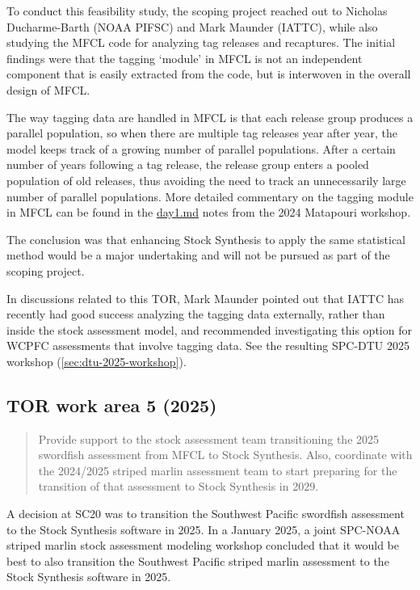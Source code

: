 \documentclass{SCreport}
\newcommand\blob
{https://github.com/PacificCommunity/ofp-sam-transition-plan/blob/main}
\begin{document}
To conduct this feasibility study, the scoping project reached out to Nicholas
Ducharme-Barth (NOAA PIFSC) and Mark Maunder (IATTC), while also studying the
MFCL code for analyzing tag releases and recaptures. The initial findings were
that the tagging `module' in MFCL is not an independent component that is easily
extracted from the code, but is interwoven in the overall design of MFCL.

The way tagging data are handled in MFCL is that each release group produces a
parallel population, so when there are multiple tag releases year after year,
the model keeps track of a growing number of parallel populations. After a
certain number of years following a tag release, the release group enters a
pooled population of old releases, thus avoiding the need to track an
unnecessarily large number of parallel populations. More detailed commentary on
the tagging module in MFCL can be found in the
\href{\blob/workshops/2024-08-matapouri/notes/day1.md}{day1.md} notes from the
2024 Matapouri workshop.

The conclusion was that enhancing Stock Synthesis to apply the same statistical
method would be a major undertaking and will not be pursued as part of the
scoping project.

In discussions related to this TOR, Mark Maunder pointed out that IATTC has
recently had good success analyzing the tagging data externally, rather than
inside the stock assessment model, and recommended investigating this option for
WCPFC assessments that involve tagging data. See the resulting SPC-DTU 2025
workshop (\autoref{sec:dtu-2025-workshop}).

\vspace{2ex}

\subsection{TOR work area 5 (2025)}

\begin{quote}\sf
  Provide support to the stock assessment team transitioning the 2025 swordfish
  assessment from MFCL to Stock Synthesis. Also, coordinate with the 2024/2025
  striped marlin assessment team to start preparing for the transition of that
  assessment to Stock Synthesis in 2029.
\end{quote}

\vspace{1ex}

A decision at SC20 was to transition the Southwest Pacific swordfish assessment
to the Stock Synthesis software in 2025. In a January 2025, a joint SPC-NOAA
striped marlin stock assessment modeling workshop concluded that it would be
best to also transition the Southwest Pacific striped marlin assessment to the
Stock Synthesis software in 2025.
\end{document}
